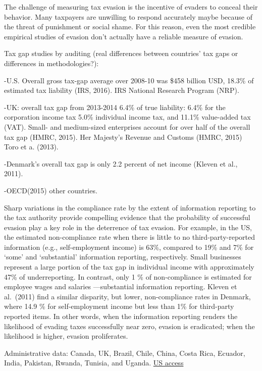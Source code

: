 \documentclass[
  12pt]{article}
\theoremstyle{definition}
\theoremstyle{remark}
\begin{document}
The challenge of measuring tax evasion is the incentive of evaders to
conceal their behavior. Many taxpayers are unwilling to respond
accurately maybe because of the threat of punishment or social shame.
For this reason, even the most credible empirical studies of evasion
don't actually have a reliable measure of evasion.

Tax gap studies by auditing (real differences between countries' tax
gaps or differences in methodologies?):

-U.S. Overall gross tax-gap average over 2008-10 was \$458 billion USD,
18.3\% of estimated tax liability (IRS, 2016). IRS National Research
Program (NRP).

-UK: overall tax gap from 2013-2014 6.4\% of true liability: 6.4\% for
the corporation income tax 5.0\% individual income tax, and 11.1\%
value-added tax (VAT). Small- and medium-sized enterprises account for
over half of the overall tax gap (HMRC, 2015). Her Majesty's Revenue and
Customs (HMRC, 2015) Toro et a. (2013).

-Denmark's overall tax gap is only 2.2 percent of net income (Kleven et
al., 2011).

-OECD(2015) other countries.

Sharp variations in the compliance rate by the extent of information
reporting to the tax authority provide compelling evidence that the
probability of successful evasion play a key role in the deterrence of
tax evasion. For example, in the US, the estimated non-compliance rate
when there is little to no third-party-reported information (e.g.,
self-employment income) is 63\%, compared to 19\% and 7\% for `some' and
`substantial' information reporting, respectively. Small businesses
represent a large portion of the tax gap in individual income with
approximately 47\% of underreporting. In contrast, only 1 \% of
non-compliance is estimated for employee wages and salaries
---substantial information reporting. Kleven et al.~(2011) find a
similar disparity, but lower, non-compliance rates in Denmark, where
14.9 \% for self-employment income but less than 1\% for third-party
reported items. In other words, when the information reporting renders
the likelihood of evading taxes successfully near zero, evasion is
eradicated; when the likelihood is higher, evasion proliferates.

Administrative data: Canada, UK, Brazil, Chile, China, Costa Rica,
Ecuador, India, Pakistan, Rwanda, Tunisia, and Uganda.
\href{https://www.irs.gov/pub/irs-soi/16jsrpprojects.pdf}{US access}
\end{document}
